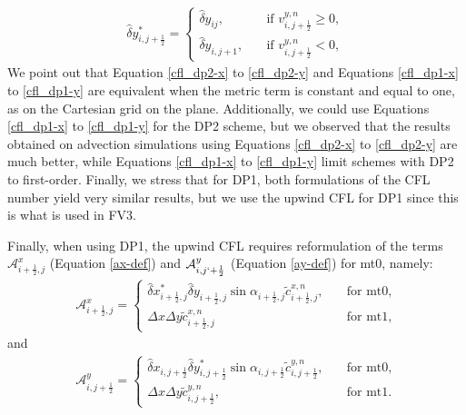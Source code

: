 \begin{align}
	\label{cfl_dp1-dy}
	 \hat{\delta} y_{i,j+\frac{1}{2}}^*  =
	\begin{cases}
	{\hat{\delta} y_{ij}},
	\quad &\text{if }{{{v}}_{i,j+\frac{1}{2}}^{y,n} \ge 0},\\
	{\hat{\delta} y_{i,j+1}}, 
	\quad &\text{if }{{{v}}_{i,j+\frac{1}{2}}^{y,n} < 0},
\end{cases}
\end{align}
We point out that Equation \eqref{cfl_dp2-x} to \eqref{cfl_dp2-y} and Equations \eqref{cfl_dp1-x} to \eqref{cfl_dp1-y} 
are equivalent when the metric term is constant and equal to one, as on the Cartesian grid on the plane.
Additionally, we could use Equations \eqref{cfl_dp1-x} to \eqref{cfl_dp1-y} for the DP2 scheme, 
but we observed that the results obtained on advection simulations using Equations \eqref{cfl_dp2-x} to \eqref{cfl_dp2-y} are much better, 
while Equations \eqref{cfl_dp1-x} to \eqref{cfl_dp1-y} limit schemes with DP2 to first-order. 
Finally, we stress that for DP1, both formulations of the CFL number yield very similar results, but we use the upwind CFL for DP1 since this is what is used in FV3.

Finally, when using DP1, the upwind CFL requires reformulation of
the terms $\mathcal{A}_{i+\frac{1}{2},j}^x$ (Equation \eqref{ax-def}) and $\mathcal{A}_{i,j`+\frac{1}{2}}^y$ (Equation \eqref{ay-def}) for mt0, namely:
\begin{align}
	\label{ax-def2}
	\mathcal{A}_{i+\frac{1}{2},j}^x= 
	\begin{cases}
		\hat{\delta} x_{i+\frac{1}{2},j}^*  \hat{\delta} y_{i+\frac{1}{2},j} 
		\sin{\alpha_{i+\frac{1}{2},j}}
		{\tilde{c}}_{i+\frac{1}{2},j}^{x,n},
		\quad &\text{for mt0},\\
		{\Delta x}{\Delta y}{\tilde{c}}_{i+\frac{1}{2},j}^{x,n}
		\quad &\text{for mt1},
	\end{cases}
\end{align}
and
\begin{align}
	\label{ay-def2}
	\mathcal{A}_{i,j+\frac{1}{2}}^y= 
	\begin{cases}
		\hat{\delta} x_{i,j+\frac{1}{2}}  \hat{\delta} y_{i,j+\frac{1}{2}}^*
		\sin{\alpha_{i,j+\frac{1}{2}}}
		{\tilde{c}}_{i,j+\frac{1}{2}}^{y,n},
		\quad &\text{for mt0},\\
		{\Delta x}{\Delta y}{\tilde{c}}_{i,j+\frac{1}{2}}^{y,n},
		\quad &\text{for mt1}.
	\end{cases}
\end{align}

